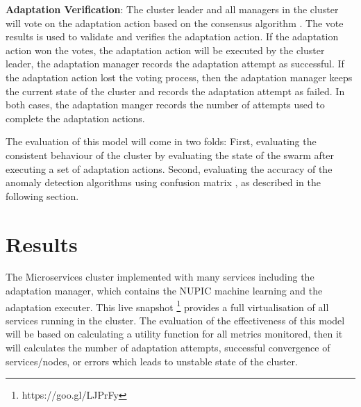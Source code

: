 \documentclass[sigconf]{acmart}
\begin{document}
\textbf{Adaptation Verification}: The cluster leader and all managers in the cluster will vote on the adaptation action based on the consensus algorithm \cite{ongaro2015raft}. The vote results is used to validate and verifies the adaptation action. If the adaptation action won the votes, the adaptation action will be executed by the cluster leader, the adaptation manager records the adaptation attempt as successful. If the adaptation action lost the voting process, then the adaptation manager keeps the current state of the cluster and records the adaptation attempt as failed. In both cases, the adaptation manger records the number of attempts used to complete the adaptation actions.   
 
The evaluation of this model will come in two folds: First, evaluating the consistent behaviour of the cluster by evaluating the state of the swarm after executing a set of adaptation actions. Second, evaluating the accuracy of the anomaly detection algorithms using confusion matrix \cite{kohavi1998confusion},  as described in the following section. 

\section{Results} 
\label{sec:evaluation}
The Microservices cluster implemented with many services including the adaptation manager, which contains the NUPIC machine learning and the adaptation executer. This live snapshot \footnote{https://goo.gl/LJPrFy} provides a full virtualisation of all services running in the cluster. The evaluation of the effectiveness of this model will be based on calculating a utility function for all metrics monitored, then it will calculates the number of adaptation attempts, successful convergence of services/nodes, or errors which leads to unstable state of the cluster. 
\end{document}
